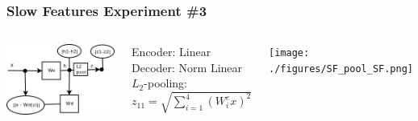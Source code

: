 \documentclass{beamer}
\begin{document}
\begin{frame}
\frametitle{Slow Features Experiment \#3}    
\begin{columns}[c]
    \column{4cm}
            \includegraphics[scale=0.3]{./figures/sfa4.png} 
            \vspace{0.1cm}
             \begin{tiny}
			 Encoder: Linear \\
			 Decoder: Norm Linear \\
			 $L_2$-pooling: $z_{11} = \sqrt{\sum_{i=1} ^4 (W^e_i x)^2}$
			\end{tiny}
    \column{4cm}
             \texttt{[image: ./figures/SF\_pool\_SF.png]} 
\end{columns} 
\end{frame} 
\end{document}
